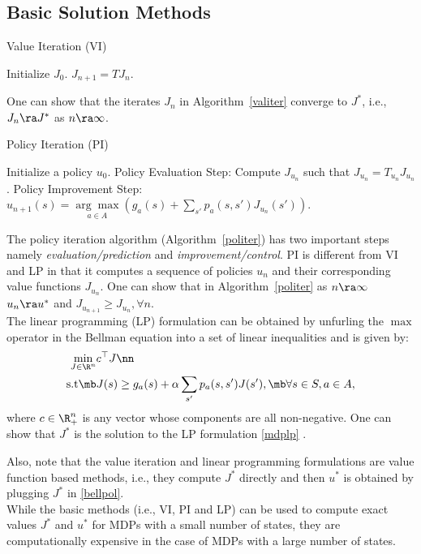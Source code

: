 \subsection{Basic Solution Methods} 
\FloatBarrier 
\begin{algorithm}[H]
\caption{Value Iteration (VI)}
\begin{algorithmic}[1]
\STATE Initialize $J_0$.
\STATE $J_{n+1}=TJ_{n}$.
\ENDFOR 
\end{algorithmic}
\label{valiter}
\end{algorithm}
One can show that the iterates $J_n$ in Algorithm~\ref{valiter} converge to $J^*$, i.e., $J_n\ra J^*$ as $n\ra \infty$.\\
\FloatBarrier 
\begin{algorithm}[H]
\caption{Policy Iteration (PI)}
\begin{algorithmic}[1]
\STATE Initialize a policy $u_0$.
\STATE Policy Evaluation Step: Compute $J_{u_n}$ such that $J_{u_n}= T_{u_n}J_{u_n}$.
\STATE Policy Improvement Step: $u_{n+1}(s)=\underset{a \in A}{\arg\max}(g_a(s)+\sum_{s'}p_a(s,s')J_{u_n}(s'))$.
\ENDFOR
\end{algorithmic}
\label{politer}
\end{algorithm}
The policy iteration algorithm (Algorithm~\ref{politer}) has two important steps namely \emph{evaluation/prediction} and \emph{improvement/control}. PI is different from VI and LP in that it computes a sequence of policies $u_n$ and their corresponding value functions $J_{u_n}$.  One can show that in Algorithm~\ref{politer} as $n\ra \infty$ $u_n \ra u^*$ and $J_{u_{n+1}}\geq J_{u_n}, \forall n$.\\
The linear programming (LP) formulation can be obtained by unfurling the $\max$ operator in the Bellman equation into a set of linear inequalities and is given by:
\small
\begin{align}\label{mdplp}
\min_{J\in \R^n} &c^\top J\nn\\
\text{s.t}\mb &J(s)\geq g_a(s)+\alpha\sum_{s'}p_a(s,s')J(s'), \mb\forall s\in S, a \in A,
\end{align}
\normalsize
where $c\in \R^n_+$ is any vector whose components are all non-negative. One can show that $J^*$ is the solution to the LP formulation \eqref{mdplp} \cite{BertB}. 
\begin{comment}
The LP formulation in \eqref{mdplp} can be represented in short as,
\begin{align}\label{mdplpshort}
\min_{J\in \R^n} &c^\top J\nn\\
\text{s.t}\mb &J\geq T J.
\end{align}
\end{comment}
Also, note that the value iteration and linear programming formulations are value function based methods, i.e., they compute $J^*$ directly and then $u^*$ is obtained by plugging $J^*$ in \eqref{bellpol}.\\
While the basic methods (i.e., VI, PI and LP) can be used to compute exact values $J^*$ and $u^*$ for MDPs with a small number of states, they are computationally expensive in the case of MDPs with a large number of states.\\

